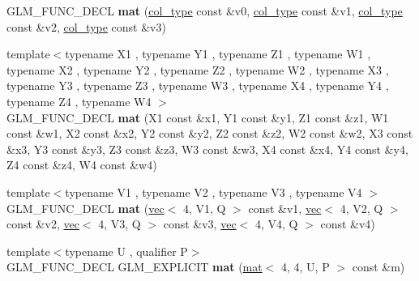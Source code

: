 \begin{DoxyCompactItemize}
\item 
\mbox{\label{structglm_1_1mat_3_014_00_014_00_01T_00_01Q_01_4_a433cd61d6aa9675bd6a96bbcc320fc9f}} 
G\+L\+M\+\_\+\+F\+U\+N\+C\+\_\+\+D\+E\+CL {\bfseries mat} (\hyperlink{structglm_1_1vec_3_014_00_01T_00_01Q_01_4}{col\+\_\+type} const \&v0, \hyperlink{structglm_1_1vec_3_014_00_01T_00_01Q_01_4}{col\+\_\+type} const \&v1, \hyperlink{structglm_1_1vec_3_014_00_01T_00_01Q_01_4}{col\+\_\+type} const \&v2, \hyperlink{structglm_1_1vec_3_014_00_01T_00_01Q_01_4}{col\+\_\+type} const \&v3)
\item 
\mbox{\label{structglm_1_1mat_3_014_00_014_00_01T_00_01Q_01_4_a9fd96e294aaffaa24196b5da04f5d168}} 
{\footnotesize template$<$typename X1 , typename Y1 , typename Z1 , typename W1 , typename X2 , typename Y2 , typename Z2 , typename W2 , typename X3 , typename Y3 , typename Z3 , typename W3 , typename X4 , typename Y4 , typename Z4 , typename W4 $>$ }\\G\+L\+M\+\_\+\+F\+U\+N\+C\+\_\+\+D\+E\+CL {\bfseries mat} (X1 const \&x1, Y1 const \&y1, Z1 const \&z1, W1 const \&w1, X2 const \&x2, Y2 const \&y2, Z2 const \&z2, W2 const \&w2, X3 const \&x3, Y3 const \&y3, Z3 const \&z3, W3 const \&w3, X4 const \&x4, Y4 const \&y4, Z4 const \&z4, W4 const \&w4)
\item 
\mbox{\label{structglm_1_1mat_3_014_00_014_00_01T_00_01Q_01_4_a0f1c2eb5a6466cedd11fd31fc7c3a430}} 
{\footnotesize template$<$typename V1 , typename V2 , typename V3 , typename V4 $>$ }\\G\+L\+M\+\_\+\+F\+U\+N\+C\+\_\+\+D\+E\+CL {\bfseries mat} (\hyperlink{structglm_1_1vec}{vec}$<$ 4, V1, Q $>$ const \&v1, \hyperlink{structglm_1_1vec}{vec}$<$ 4, V2, Q $>$ const \&v2, \hyperlink{structglm_1_1vec}{vec}$<$ 4, V3, Q $>$ const \&v3, \hyperlink{structglm_1_1vec}{vec}$<$ 4, V4, Q $>$ const \&v4)
\item 
\mbox{\label{structglm_1_1mat_3_014_00_014_00_01T_00_01Q_01_4_ac4f81685ca07229ea1a0e677b41808e9}} 
{\footnotesize template$<$typename U , qualifier P$>$ }\\G\+L\+M\+\_\+\+F\+U\+N\+C\+\_\+\+D\+E\+CL G\+L\+M\+\_\+\+E\+X\+P\+L\+I\+C\+IT {\bfseries mat} (\hyperlink{structglm_1_1mat}{mat}$<$ 4, 4, U, P $>$ const \&m)

\end{DoxyCompactItemize}
